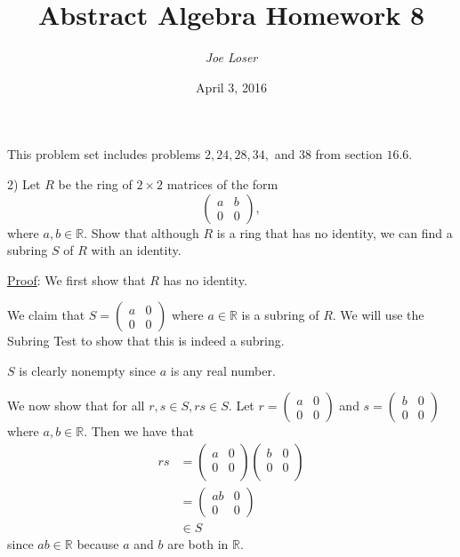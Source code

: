 \documentclass{article}
\title{Abstract Algebra Homework 8}
\author{\textit{Joe Loser}}
\date{April 3, 2016}
\begin{document}
\maketitle

This problem set includes problems $2, 24, 28, 34,$ and $38$ from section $16.6$.

2) Let $R$ be the ring of $2 \times 2$ matrices of the form
$$ \begin{pmatrix}
	a & b \\
	0 & 0
\end{pmatrix},$$ 
where $a, b \in \mathbb{R}$. Show that although $R$ is a ring that has no identity, we can find a subring $S$ of $R$ with an identity.

\underline{Proof}: We first show that $R$ has no identity. 

We claim that $S =
\begin{pmatrix}
	a & 0 \\
	0 & 0
\end{pmatrix}$ where $a \in \mathbb{R}$ is a subring of $R$. We will use the Subring Test to show that this is indeed a subring.

$S$ is clearly nonempty since $a$ is any real number.

We now show that for all $r, s \in S, rs \in S$. Let $r = 
\begin{pmatrix}
	a & 0 \\
	0 & 0
\end{pmatrix}$ and $s =
\begin{pmatrix}
	b & 0 \\
	0 & 0
\end{pmatrix}$ where $a, b \in \mathbb{R}$. Then we have that 
\begin{align*}
	rs &= 
	\begin{pmatrix}
		a & 0 \\
		0 & 0 \\
	\end{pmatrix}
	\begin{pmatrix}
		b & 0 \\
		0 & 0 \\
	\end{pmatrix} \\
	&= \begin{pmatrix}
		ab & 0 \\
		0 & 0
	\end{pmatrix} \\
	& \in S
\end{align*} since $ab \in \mathbb{R}$ because $a$ and $b$ are both in $\mathbb{R}$. 
\end{document}
